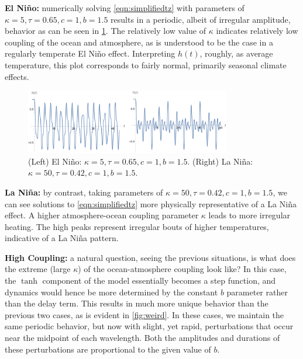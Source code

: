 \documentclass[12pt]{article}
\begin{document}
\noindent\textbf{El Niño: } numerically solving \cref{eqn:simplifiedtz} with parameters of $\kappa = 5, \tau = 0.65, c = 1, b = 1.5$ results in a periodic, albeit of irregular amplitude, behavior as can be seen in \cref{fig:elnino}. The relatively low value of $\kappa$ indicates relatively low coupling of the ocean and atmosphere, as is understood to be the case in a regularly temperate El Niño effect. Interpreting $h(t)$, roughly, as average temperature, this plot corresponds to fairly normal, primarily seasonal climate effects. 
\newline
\begin{figure}
    \centering
    \includegraphics*[width=0.8\textwidth]{figures/nino.png}
    \caption{(Left) El Niño: $\kappa = 5, \tau = 0.65, c = 1, b = 1.5$. (Right) La Niña: $\kappa = 50, \tau = 0.42, c = 1, b = 1.5$.}
    \label{fig:elnino}
\end{figure}

\noindent\textbf{La Niña: } by contrast, taking parameters of $\kappa = 50, \tau = 0.42, c = 1, b = 1.5$, we can see solutions to \cref{eqn:simplifiedtz} more physically representative of a La Niña effect. A higher atmosphere-ocean coupling parameter $\kappa$ leads to more irregular heating. The high peaks represent irregular bouts of higher temperatures, indicative of a La Niña pattern.
\newline

\noindent\textbf{High Coupling: } a natural question, seeing the previous situations, is what does the extreme (large $\kappa$) of the ocean-atmosphere coupling look like? In this case, the $\tanh$ component of the model essentially becomes a step function, and dynamics would hence be more determined by the constant $b$ parameter rather than the delay term. This results in much more unique behavior than the previous two cases, as is evident in \cref{fig:weird}. In these cases, we maintain the same periodic behavior, but now with slight, yet rapid, perturbations that occur near the midpoint of each wavelength. Both the amplitudes and durations of these perturbations are proportional to the given value of $b$.
\end{document}
